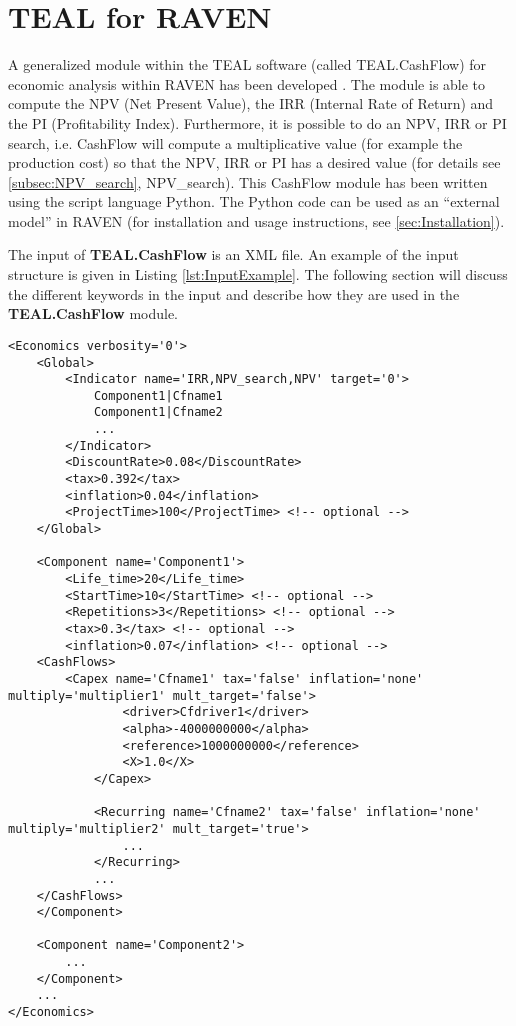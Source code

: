\section{TEAL for RAVEN}
A generalized module within the TEAL software (called TEAL.CashFlow) for economic analysis within RAVEN has been developed \cite{MSApril2017}. The module is able to compute
the NPV (Net Present Value), the IRR (Internal Rate of Return) and the PI (Profitability Index). Furthermore, it is possible to
do an NPV, IRR or PI search, i.e. CashFlow will compute a multiplicative value (for example the production cost) so that the
NPV, IRR or PI has a desired value (for details see \ref{subsec:NPV_search}, NPV\_search). This CashFlow module has been written using the script language Python.
The Python code can be used as an ``external model'' in RAVEN (for installation and usage instructions, see \ref{sec:Installation}).

The input of \textbf{TEAL.CashFlow} is an XML file. An example of the input structure is given in Listing \ref{lst:InputExample}. The following section will discuss the
 different keywords in the input and describe how they are used in the \textbf{TEAL.CashFlow} module.

\begin{lstlisting}[style=XML,morekeywords={anAttribute},caption=Economics input example., label=lst:InputExample]
<Economics verbosity='0'>
    <Global>
        <Indicator name='IRR,NPV_search,NPV' target='0'>
            Component1|Cfname1
            Component1|Cfname2
            ...
        </Indicator>
        <DiscountRate>0.08</DiscountRate>
        <tax>0.392</tax>
        <inflation>0.04</inflation>
        <ProjectTime>100</ProjectTime> <!-- optional -->
    </Global>

    <Component name='Component1'>
        <Life_time>20</Life_time>
        <StartTime>10</StartTime> <!-- optional -->
        <Repetitions>3</Repetitions> <!-- optional -->
        <tax>0.3</tax> <!-- optional -->
        <inflation>0.07</inflation> <!-- optional -->
	<CashFlows>
	    <Capex name='Cfname1' tax='false' inflation='none' multiply='multiplier1' mult_target='false'>
    	        <driver>Cfdriver1</driver>
                <alpha>-4000000000</alpha>
                <reference>1000000000</reference>
                <X>1.0</X>
            </Capex>

            <Recurring name='Cfname2' tax='false' inflation='none' multiply='multiplier2' mult_target='true'>
                ...
            </Recurring>
            ...
	</CashFlows>
    </Component>

    <Component name='Component2'>
        ...
    </Component>
    ...
</Economics>
\end{lstlisting}

